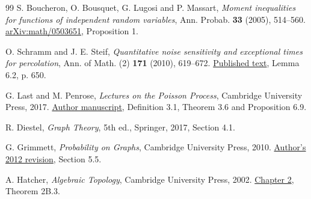\documentclass[11pt]{article}
\begin{document}
\begin{thebibliography}{99}
S. Boucheron, O. Bousquet, G. Lugosi and P. Massart,
\emph{Moment inequalities for functions of independent random variables},
Ann. Probab. \textbf{33} (2005), 514--560.
\href{https://arxiv.org/abs/math/0503651}{arXiv:math/0503651}, Proposition 1.

O. Schramm and J. E. Steif,
\emph{Quantitative noise sensitivity and exceptional times for percolation},
Ann. of Math. (2) \textbf{171} (2010), 619--672.
\href{https://annals.math.princeton.edu/wp-content/uploads/annals-v171-n2-p01-p.pdf}{Published text},
Lemma 6.2, p. 650.

G. Last and M. Penrose,
\emph{Lectures on the Poisson Process}, Cambridge University Press, 2017.
\href{https://stoch.math.kit.edu/img/Last/lastpenrose2017.pdf}{Author manuscript},
Definition 3.1, Theorem 3.6 and Proposition 6.9.

R. Diestel, \emph{Graph Theory}, 5th ed., Springer, 2017, Section 4.1.

G. Grimmett, \emph{Probability on Graphs}, Cambridge University Press, 2010.
\href{https://www.statslab.cam.ac.uk/~grg/books/USpgs-rev3.pdf}{Author's 2012 revision},
Section 5.5.

A. Hatcher, \emph{Algebraic Topology}, Cambridge University Press, 2002.
\href{https://pi.math.cornell.edu/~hatcher/AT/ATch2.pdf}{Chapter 2}, Theorem 2B.3.
\end{thebibliography}
\end{document}
